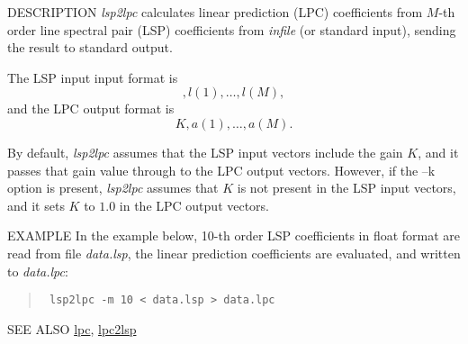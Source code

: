 \begin{synopsis}
\item [lsp2lpc] [ --m $M$ ] [ --s $S$ ] [ --k ] [ --l ] [ --i $I$ ] [ {\em infile} ] 
\end{synopsis}

\begin{qsection}{DESCRIPTION}
{\em lsp2lpc} calculates linear prediction (LPC) coefficients 
from $M$-th order line spectral pair (LSP) coefficients 
from {\em infile} (or standard input),
sending the result to standard output.

The LSP input input format is
\begin{displaymath}
   [ K ], l(1), \dots , l(M), 
\end{displaymath}
and the LPC output format is
\begin{displaymath}
   K , a(1), \dots , a(M).
\end{displaymath}

By default, {\em lsp2lpc} assumes that 
the LSP input vectors include the gain $K$, 
and it passes that gain value through to the LPC output vectors.  
However, if the --k option is present, 
{\em lsp2lpc} assumes that $K$ is not present in the LSP input vectors, 
and it sets $K$ to $1.0$ in the LPC output vectors.
\end{qsection}

\begin{options}
\end{options}

\begin{qsection}{EXAMPLE}
In the example below, 10-th order LSP coefficients in float format
are read from file {\em data.lsp}, the linear prediction coefficients
are evaluated, and written to {\em data.lpc}:
\begin{quote}
\verb! lsp2lpc -m 10 < data.lsp > data.lpc!
\end{quote}
\end{qsection}

\begin{qsection}{SEE ALSO}
\hyperlink{lpc}{lpc},
\hyperlink{lpc2lsp}{lpc2lsp}
\end{qsection}

